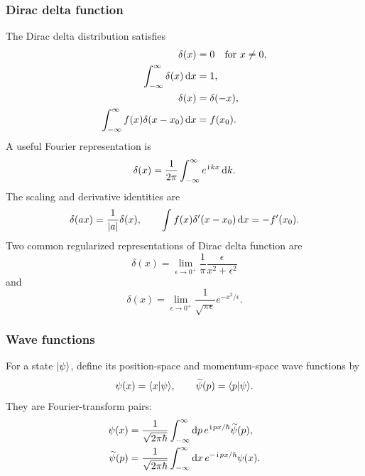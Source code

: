 \subsubsection{Dirac delta function}
The Dirac delta distribution satisfies
\begin{align}
 \delta(x)&=0\quad\text{for }x\neq0,\\
 \int_{-\infty}^{\infty}\delta(x)\,\mathrm{d} x&=1,\\
 \delta(x)&=\delta(-x),\\
 \int_{-\infty}^{\infty}f(x)\delta(x-x_0)\,\mathrm{d} x&=f(x_0).
\end{align}
A useful Fourier representation is
\begin{equation}
 \delta(x)=\frac{1}{2\pi}\int_{-\infty}^{\infty}
 e^{\hspace{1pt}\mathrm{i}\hspace{1pt} kx}\,\mathrm{d} k.
\end{equation}
The scaling and derivative identities are
\begin{equation}
 \delta(ax)=\frac{1}{|a|}\delta(x),
 \qquad
 \int f(x)\delta'(x-x_0)\,\mathrm{d} x=-f'(x_0).
\end{equation}
Two common regularized representations of Dirac delta function are
\begin{equation}
 \delta(x)=\lim_{\epsilon\to0^+}
 \frac{1}{\pi}\frac{\epsilon}{x^2+\epsilon^2}
\end{equation}
and
\begin{equation}
 \delta(x)=\lim_{\epsilon\to0^+}
 \frac{1}{\sqrt{\pi\epsilon}}e^{-x^2/\epsilon}.
\end{equation}

\subsubsection{Wave functions}
For a state $|{\psi}\rangle$, define its position-space and momentum-space wave
functions by
\begin{equation}
 \psi(x)=\langle{x|\psi}\rangle,
 \qquad
 \widetilde{\psi}(p)=\langle{p|\psi}\rangle.
\end{equation}
They are Fourier-transform pairs:
\begin{align}
 \psi(x)&=\frac{1}{\sqrt{2\pi\hbar}}
 \int_{-\infty}^{\infty}\mathrm{d} p\,
 e^{\hspace{1pt}\mathrm{i}\hspace{1pt} px/\hbar}\widetilde{\psi}(p),\\
 \widetilde{\psi}(p)&=\frac{1}{\sqrt{2\pi\hbar}}
 \int_{-\infty}^{\infty}\mathrm{d} x\,
 e^{-\hspace{1pt}\mathrm{i}\hspace{1pt} px/\hbar}\psi(x).
\end{align}


